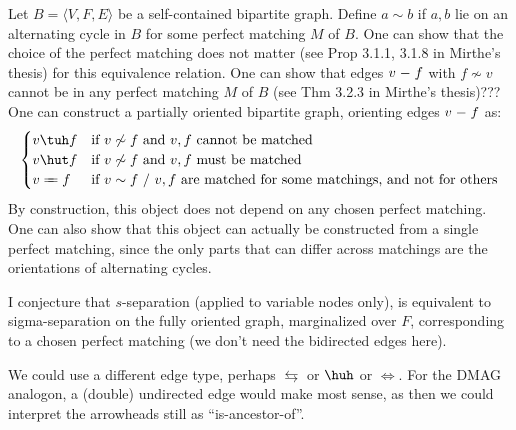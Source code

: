 \begin{Def}
  Let $B = \langle V, F, E \rangle$ be a self-contained bipartite graph.
  Define $a \sim b$ if $a,b$ lie on an alternating cycle in $B$ for some perfect matching $M$ of $B$.
  One can show that the choice of the perfect matching does not matter (see Prop 3.1.1, 3.1.8 in Mirthe's thesis) for this equivalence relation.
  One can show that edges $v \relbar f$ with $f \not\sim v$ cannot be in any perfect matching $M$ of $B$ (see Thm 3.2.3 in Mirthe's thesis)???
  One can construct a partially oriented bipartite graph, orienting edges $v \relbar f$ as:
  $$\begin{cases}
    v \tuh f & \text{if $v \not\sim f$ and $v,f$ cannot be matched} \\
    v \hut f & \text{if $v \not\sim f$ and $v,f$ must be matched} \\
    v \otto f & \text{if $v \sim f$ / $v,f$ are matched for some matchings, and not for others} 
  \end{cases}$$
  By construction, this object does not depend on any chosen perfect matching.
  One can also show that this object can actually be constructed from a single perfect matching,
  since the only parts that can differ across matchings are the orientations of alternating cycles.

  I conjecture that $s$-separation (applied to variable nodes only), is equivalent 
  to sigma-separation on the fully oriented graph, marginalized over $F$, corresponding to
  a chosen perfect matching (we don't need the bidirected edges here).

  We could use a different edge type, perhaps $\leftrightarrows$ or $\huh$ or $\Leftrightarrow$.
  For the DMAG analogon, a (double) undirected edge would make most sense, as
  then we could interpret the arrowheads still as ``is-ancestor-of''.


\end{Def}
